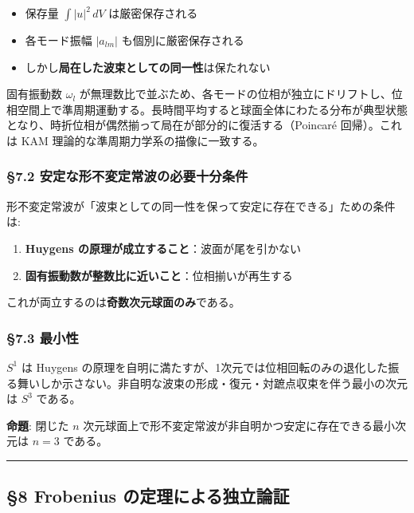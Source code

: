 \documentclass[
  a4paper,11pt]{ltjsarticle}
\providecommand{\tightlist}{%
  \setlength{\itemsep}{0pt}\setlength{\parskip}{0pt}}
\theoremstyle{definition}
\theoremstyle{remark}
\begin{document}
\begin{itemize}
\tightlist
\item
  保存量 \(\int |u|^2 \, dV\) は厳密保存される
\item
  各モード振幅 \(|a_{lm}|\) も個別に厳密保存される
\item
  しかし\textbf{局在した波束としての同一性}は保たれない
\end{itemize}

固有振動数 \(\omega_l\)
が無理数比で並ぶため、各モードの位相が独立にドリフトし、位相空間上で準周期運動する。長時間平均すると球面全体にわたる分布が典型状態となり、時折位相が偶然揃って局在が部分的に復活する（Poincaré
回帰）。これは KAM 理論的な準周期力学系の描像に一致する。

\subsubsection{§7.2
安定な形不変定常波の必要十分条件}\label{ux5b89ux5b9aux306aux5f62ux4e0dux5909ux5b9aux5e38ux6ce2ux306eux5fc5ux8981ux5341ux5206ux6761ux4ef6}

形不変定常波が「波束としての同一性を保って安定に存在できる」ための条件は:

\begin{enumerate}
\def\labelenumi{\arabic{enumi}.}
\tightlist
\item
  \textbf{Huygens の原理が成立すること}：波面が尾を引かない
\item
  \textbf{固有振動数が整数比に近いこと}：位相揃いが再生する
\end{enumerate}

これが両立するのは\textbf{奇数次元球面のみ}である。

\subsubsection{§7.3 最小性}\label{ux6700ux5c0fux6027}

\(S^1\) は Huygens
の原理を自明に満たすが、1次元では位相回転のみの退化した振る舞いしか示さない。非自明な波束の形成・復元・対蹠点収束を伴う最小の次元は
\textbf{\(S^3\)} である。

\textbf{命題}: 閉じた \(n\)
次元球面上で形不変定常波が非自明かつ安定に存在できる最小次元は \(n = 3\)
である。

\begin{center}\rule{0.5\linewidth}{0.5pt}\end{center}

\subsection{§8 Frobenius
の定理による独立論証}\label{frobenius-ux306eux5b9aux7406ux306bux3088ux308bux72ecux7acbux8ad6ux8a3c}
\end{document}
